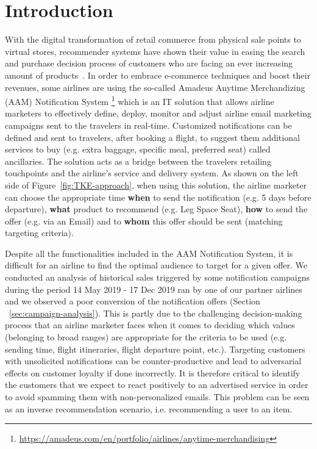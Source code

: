 \documentclass[11pt,dvipdfm]{article}
\begin{document}
\section{Introduction}
\label{sec:introduction}
With the digital transformation of retail commerce from physical sale points to virtual stores, recommender systems have shown their value in easing the search and purchase decision process of customers who are facing an ever increasing amount of products~\cite{Dadoun21}. In order to embrace e-commerce techniques and boost their revenues, some airlines are using the so-called Amadeus Anytime Merchandizing (AAM) Notification System \footnote{\url{https://amadeus.com/en/portfolio/airlines/anytime-merchandising}} which is an IT solution that allows airline marketers to effectively define, deploy, monitor and adjust airline email marketing campaigns sent to the travelers in real-time. Customized notifications can be defined and sent to travelers, after booking a flight, to suggest them additional services to buy (e.g. extra baggage, specific meal, preferred seat) called ancillaries. The solution acts as a bridge between the travelers retailing touchpoints and the airline's service and delivery system. As shown on the left side of Figure~\ref{fig:TKE-approach}, when using this solution, the airline marketer can choose the appropriate time \textbf{when} to send the notification (e.g. 5 days before departure), \textbf{what} product to recommend (e.g. Leg Space Seat), \textbf{how} to send the offer (e.g. via an Email) and to \textbf{whom} this offer should be sent (matching targeting criteria).

Despite all the functionalities included in the AAM Notification System, it is difficult for an airline to find the optimal audience to target for a given offer. We conducted an analysis of historical sales triggered by some notification campaigns during the period 14 May 2019 - 17 Dec 2019 ran by one of our partner airlines and we observed a poor conversion of the notification offers (Section ~\ref{sec:campaign-analysis}). This is partly due to the challenging decision-making process that an airline marketer faces when it comes to deciding which values (belonging to broad ranges) are appropriate for the criteria to be used (e.g. sending time, flight itineraries, flight departure point, etc.). Targeting customers with unsolicited notifications can be counter-productive and lead to adversarial effects on customer loyalty if done incorrectly. It is therefore critical to identify the customers that we  expect to react positively to an advertised service in order to avoid spamming them with non-personalized emails. This problem can be seen as an inverse recommendation scenario, i.e. recommending a user to an item.
\end{document}
